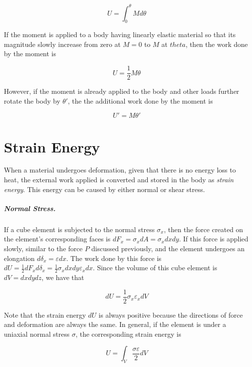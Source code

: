 \documentclass[
10pt,
a4paper,
openany,
svgnames,
]{kaobook} %
\begin{document}
  \begin{equation}
  U = \int_0^\theta M d\theta
\end{equation}

If the moment is applied to a body having linearly elastic material so that its magnitude slowly increase from zero at $M = 0$ to $M$ at $theta$, then the work done by the moment is

\begin{equation}
  U = \frac{1}{2} M \theta
\end{equation}

However, if the moment is already applied to the body and other loads further rotate the body by $\theta'$, the the additional work done by the moment is

\begin{equation}
  U' = M \theta'
\end{equation}

\section{Strain Energy}

When a material undergoes deformation, given that there is no energy loss to heat, the external work applied is converted and stored in the body as \emph{strain energy}. This energy can be caused by either normal or shear stress.

\subparagraph{Normal Stress.}

If a cube element is subjected to the normal stress $\sigma_x$, then the force created on the element's corresponding faces is $dF_x = \sigma_x dA = \sigma_x dx dy$. If this force is applied slowly, similar to the force $P$ discussed previously, and the element undergoes an elongation $d\delta_x = \varepsilon dx$. The work done by this force is $dU = \frac{1}{2}dF_xd\delta_x = \frac{1}{2} \sigma_xdxdy\varepsilon_xdx$. Since the volume of this cube element is $dV = dxdydz$, we have that 

\begin{equation}
  dU = \frac{1}{2}\sigma_x \varepsilon_x dV
\end{equation}

Note that the strain energy $dU$ is always positive because the directions of force and deformation are always the same. In general, if the element is under a uniaxial normal stress $\sigma$, the corresponding strain energy is

\begin{equation}
  U = \int_V \frac{\sigma \varepsilon}{2} dV
\end{equation}
\end{document}

